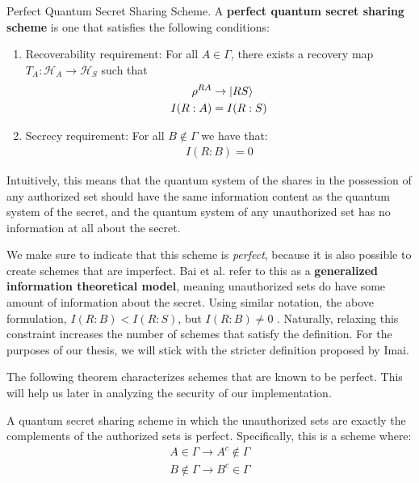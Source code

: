 \begin{definition}{Perfect Quantum Secret Sharing Scheme.}
    \label{defn:perfect-qss}
    A \textbf{perfect quantum secret sharing scheme} is one that satisfies the following conditions:
    \begin{enumerate}
        \item Recoverability requirement: For all $A \in \Gamma$, there exists a recovery map $T_A: \mathcal{H}_A \to \mathcal{H}_S$ such that 
        \begin{align} 
            \rho^{RA} &\to \ket{RS} \\
            I(R:A) &= I(R:S)
        \end{align}
        \item Secrecy requirement: For all $B \notin \Gamma$ we have that:
        \begin{align}
            I(R:B) = 0
        \end{align}
    \end{enumerate}
    Intuitively, this means that the quantum system of the shares in the possession of any authorized set should have the same information content as the quantum system of the secret, and the quantum system of any unauthorized set has no information at all about the secret.
\end{definition}

We make sure to indicate that this scheme is \textit{perfect}, because it is also possible to create schemes that are imperfect. Bai et al. refer to this as a \textbf{generalized information theoretical model}, meaning unauthorized sets do have some amount of information about the secret. Using similar notation, the above formulation, $I(R:B) < I(R:S)$, but $I(R:B) \neq 0$ \cite{bai_generalized_2016}. Naturally, relaxing this constraint increases the number of schemes that satisfy the definition. For the purposes of our thesis, we will stick with the stricter definition proposed by Imai.

The following theorem characterizes schemes that are known to be perfect. This will help us later in analyzing the security of our implementation.

\begin{theorem}
    A quantum secret sharing scheme in which the unauthorized sets are exactly the complements of the authorized sets is perfect. Specifically, this is a scheme where:
    \begin{align}
        A \in \Gamma \to A^c \notin \Gamma \\ 
        B \notin \Gamma \to B^c \in \Gamma
    \end{align}
\end{theorem}

